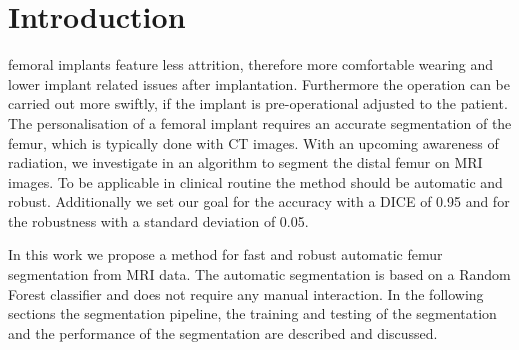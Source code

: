 \section{Introduction}
 femoral implants feature less attrition, therefore more comfortable wearing and lower implant related issues after implantation. Furthermore the operation can be carried out more swiftly, if the implant is pre-operational adjusted to the patient. The personalisation of a femoral implant requires an accurate segmentation of the femur, which is typically done with CT images. With an upcoming awareness of radiation, we investigate in an algorithm to segment the distal femur on MRI images. To be applicable in clinical routine the method should be automatic and robust. Additionally we set our goal for the accuracy with a DICE of 0.95 and for the robustness with a standard deviation of 0.05.

In this work we propose a method for fast and robust automatic femur segmentation from MRI data. The automatic segmentation is based on a Random Forest classifier \cite{rf} and does not require any manual interaction. In the following sections the segmentation pipeline, the training and testing of the segmentation and the performance of the segmentation are described and discussed.